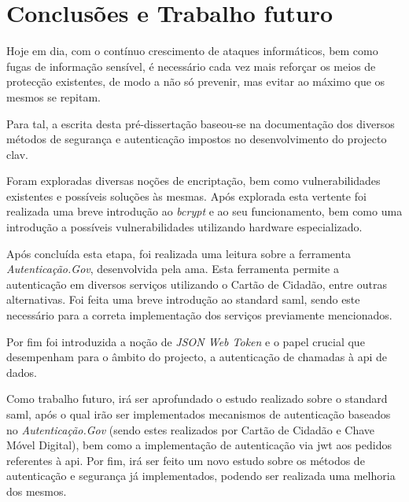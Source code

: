 \chapter{Conclusões e Trabalho futuro}

Hoje em dia, com o contínuo crescimento de ataques informáticos, bem como fugas de informação sensível, é necessário cada vez mais reforçar os meios de protecção existentes, de modo a não só prevenir, mas evitar ao máximo que os mesmos se repitam.

Para tal, a escrita desta pré-dissertação baseou-se na documentação dos diversos métodos de segurança e autenticação impostos no desenvolvimento do projecto \gls{clav}.

Foram exploradas diversas noções de encriptação, bem como vulnerabilidades existentes e possíveis soluções às mesmas. Após explorada esta vertente foi realizada uma breve introdução ao \emph{bcrypt} e ao seu funcionamento, bem como uma introdução a possíveis vulnerabilidades utilizando hardware especializado.

Após concluída esta etapa, foi realizada uma leitura sobre a ferramenta \emph{Autenticação.Gov}, desenvolvida pela \gls{ama}. Esta ferramenta permite a autenticação em diversos serviços utilizando o Cartão de Cidadão, entre outras alternativas. Foi feita uma breve introdução ao standard \gls{saml}, sendo este necessário para a correta implementação dos serviços previamente mencionados.

Por fim foi introduzida a noção de \emph{JSON Web Token} e o papel crucial que desempenham para o âmbito do projecto, a autenticação de chamadas à \gls{api} de dados.

Como trabalho futuro, irá ser aprofundado o estudo realizado sobre o standard \gls{saml}, após o qual irão ser implementados mecanismos de autenticação baseados no \emph{Autenticação.Gov} (sendo estes realizados por Cartão de Cidadão e Chave Móvel Digital), bem como a implementação de autenticação via \gls{jwt} aos pedidos referentes à \gls{api}. Por fim, irá ser feito um novo estudo sobre os métodos de autenticação e segurança já implementados, podendo ser realizada uma melhoria dos mesmos.